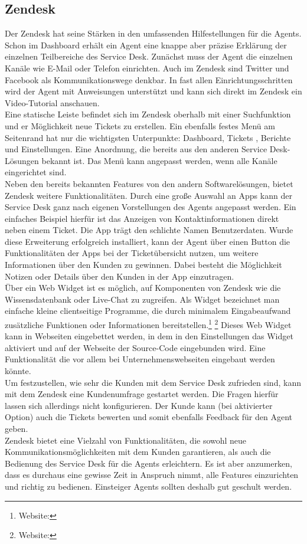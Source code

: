\subsection{Zendesk}
\noindent 
Der Zendesk hat seine Stärken in den umfassenden Hilfestellungen für die Agents. Schon im Dashboard erhält ein Agent eine knappe aber präzise Erklärung der einzelnen Teilbereiche des Service Desk. Zunächst muss der Agent die einzelnen Kanäle wie E-Mail oder Telefon einrichten. Auch im Zendesk sind  Twitter und Facebook als Kommunikationswege denkbar. In fast allen Einrichtungsschritten wird der Agent mit Anweisungen unterstützt und kann sich direkt im Zendesk ein Video-Tutorial anschauen.\\
Eine statische Leiste befindet sich im Zendesk oberhalb mit einer Suchfunktion und er Möglichkeit neue Tickets zu erstellen. Ein ebenfalls festes Menü am Seitenrand hat nur die wichtigsten Unterpunkte: Dashboard, Tickets , Berichte und Einstellungen. Eine Anordnung, die bereits aus den anderen Service Desk-Lösungen bekannt ist. Das Menü kann angepasst werden, wenn alle Kanäle eingerichtet sind.\\
Neben den bereits bekannten Features von den andern Softwarelösungen, bietet Zendesk weitere Funktionalitäten. Durch eine große Auswahl an Apps kann der Service Desk ganz nach eigenen Vorstellungen des Agents angepasst werden. Ein einfaches Beispiel hierfür ist das Anzeigen von Kontaktinformationen direkt neben einem Ticket. Die App trägt den schlichte Namen Benutzerdaten. Wurde diese Erweiterung erfolgreich installiert, kann der Agent über einen Button die Funktionalitäten der Apps bei der Ticketübersicht nutzen,  um weitere Informationen über den Kunden zu gewinnen. Dabei besteht die Möglichkeit Notizen oder Details über den Kunden in der App einzutragen.\\
Über ein Web Widget ist es möglich, auf Komponenten von Zendesk wie die Wissensdatenbank oder Live-Chat zu zugreifen. Als Widget bezeichnet man einfache kleine clientseitige Programme, die durch minimalem Eingabeaufwand zusätzliche Funktionen oder Informationen bereitstellen.\footnote{Website:\cite{Widget1}} \footnote{Website:\cite{Widget2}} Dieses Web Widget kann in Webseiten eingebettet werden, in dem in den Einstellungen das Widget aktiviert und auf der Webseite der Source-Code eingebunden wird. Eine Funktionalität die vor allem bei Unternehmenswebseiten  eingebaut werden könnte.\\
Um festzustellen, wie sehr die Kunden mit dem Service Desk zufrieden sind, kann mit dem Zendesk eine Kundenumfrage gestartet werden. Die Fragen hierfür lassen sich allerdings nicht konfigurieren. Der Kunde kann (bei aktivierter Option) auch die Tickets bewerten und somit ebenfalls Feedback für den Agent geben.\\
Zendesk bietet eine Vielzahl von Funktionalitäten, die sowohl neue Kommunikationsmöglichkeiten mit dem Kunden garantieren, als auch die Bedienung des Service Desk für die Agents erleichtern. Es ist aber anzumerken, dass es durchaus eine gewisse Zeit in Anspruch nimmt, alle Features einzurichten und richtig zu bedienen. Einsteiger Agents sollten deshalb gut geschult werden.

